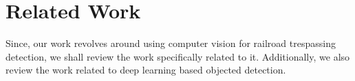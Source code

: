 \section{Related Work}
\label{sec:related-work}
Since, our work revolves around using computer vision for railroad trespassing detection, we shall review the work specifically related to it. Additionally, we also review the work related to deep learning based objected detection.  

\begin{comment}
\subsection{Railroad trespassing related safety} Considerable efforts have been made to understand the risks associated with trespassing activity and developing strategies to reduce those risks. Caird et al.\cite{caird2002human} developed a taxonomy of human factors that contribute towards the unsafe human activity.  The taxonomy groups  common accident contributors in 6 categories: unsafe actions, individual differences, train visibility, passive signs, active warning systems and physical constraints. As opposed to Caird et al.\cite{caird2002human}, Sussman and Raslear\cite{sussman2007railroad} indicated intentional, distraction-caused or other (visibility issues or driver confusion) reasons for accidents. All of these issues require different approaches to solve the problem. However, those approaches can broadly be classified as engineering, education and enforcement-based.

Apart from studying the strategies to reduce the risk, efforts have been made to quantify the frequency and severity of accidents. US Department of Transportation (DOT) accident prediction model is the most widely used method to predict expected no. of collisions per year, at a given crossing site \cite{austin2002alternative,tustin1986railroad}. It is based on different parameters related to traffic volume, train time table and previous accident history \cite{chadwick2014highway}. This method has been compared to Transport Canada Accident Model \cite{saccomanno2003identifying} by Chaudhary et al.\cite{chaudhary2011railroad}. Chaudhary et al. reports that overall US DOT model predicts the yearly number of accidents more accurately. However, in cases where the crossing had an accident history, the Transport Canada model outperformed US DOT model. As a conclusion, they suggested to adapt the Transport Canada model to US crossing data and use it to rank the most dangerous crossings.


\end{comment}
